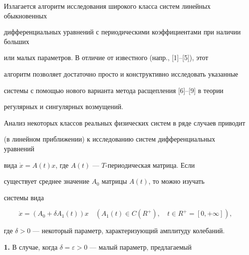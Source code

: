 

\maketitle


\label{begin}














Излагается алгоритм исследования широкого класса систем линейных обыкновенных 


дифференциальных уравнений с периодическими коэффициентами при наличии больших


или малых параметров. В отличие от известного (напр., [1]--[5]), этот 


алгоритм позволяет достаточно просто и конструктивно исследовать указанные 


системы с помощью нового варианта метода расщепления [6]--[9] в теории 


регулярных и сингулярных возмущений.





Анализ некоторых классов реальных физических систем в ряде случаев приводит 


(в линейном приближении) к исследованию систем дифференциальных уравнений 


вида $\Dot{x}=A(t)x$, где $A(t)$ --- $T$-периодическая матрица. Если 


существует среднее значение $A_0$ матрицы $A(t)$, то можно изучать 


системы вида


\begin{equation} 


\Dot{x}=(A_0+\delta A_1(t))x \quad(A_1(t)\in C(R^+),\quad


t\in R^+=[0,+\infty]),


\end{equation}


где $\delta> 0$ --- некоторый параметр, характеризующий амплитуду колебаний.


\medskip





{\bf 1.} В случае, когда $\delta=\varepsilon>0$ --- малый параметр, предлагаемый 


